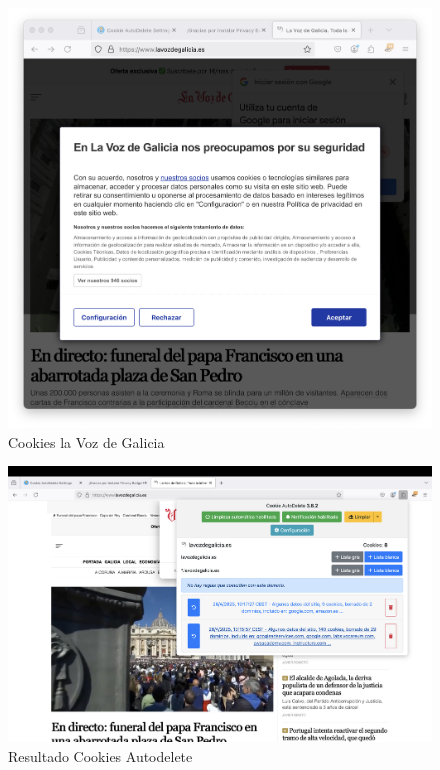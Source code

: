 \begin{figure}[H]   
    \includegraphics[width=\textwidth]{cookies_lavoz.png}
    \caption{Cookies la Voz de Galicia}
    \label{fig:cookies_lavoz}
\end{figure}

\begin{figure}[H]   
    \includegraphics[width=\textwidth]{resultado_cookies_autodelete.png}
    \caption{Resultado Cookies Autodelete}
    \label{fig:resultado_cookies_autodelete}
\end{figure}

